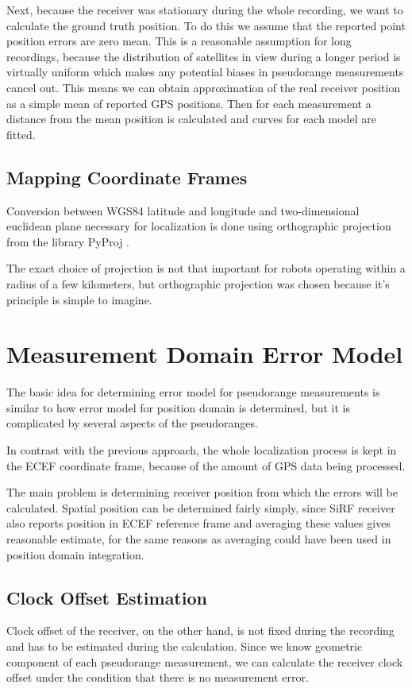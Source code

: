 Next, because the receiver was stationary during the whole recording, we want to
calculate the ground truth position.
To do this we assume that the reported point position errors are zero mean.
This is a reasonable assumption for long recordings,
because the distribution of satellites in view during a longer period is
virtually uniform which makes any potential biases in pseudorange measurements
cancel out.
This means we can obtain approximation of the real receiver position as a simple
mean of reported GPS positions.
Then for each measurement a distance from the mean position is calculated and
curves for each model are fitted.

\subsection{Mapping Coordinate Frames}
\label{sec:impl-coordinates}
Conversion between WGS84 latitude and longitude and two-dimensional euclidean
plane necessary for localization is done using orthographic projection from
the library PyProj \cite{www-pyproj}.

The exact choice of projection is not that important for robots operating within
a radius of a few kilometers, but orthographic projection was chosen because
it's principle is simple to imagine.

\section{Measurement Domain Error Model}
The basic idea for determining error model for pseudorange measurements is
similar to how error model for position domain is determined, but it is complicated
by several aspects of the pseudoranges.

In contrast with the previous approach, the whole localization process is kept in
the ECEF coordinate frame, because of the amount of GPS data being processed.

The main problem is determining receiver position from which the errors will be
calculated.
Spatial position can be determined fairly simply, since SiRF receiver also
reports position in ECEF reference frame and averaging these values gives
reasonable estimate, for the same reasons as averaging could have been used in
position domain integration.

\subsection{Clock Offset Estimation}
\label{sec:impl-clock-offsets}
Clock offset of the receiver, on the other hand, is not fixed during the recording
and has to be estimated during the calculation.
Since we know geometric component of each pseudorange measurement, we can
calculate the receiver clock offset under the condition that there is no measurement
error.

